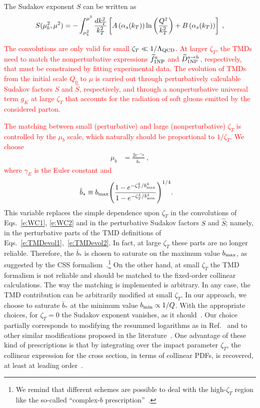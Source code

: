 \documentclass[aps,preprintnumbers,showpacs,nofootinbib,superscriptaddress,floatfix]{revtex4}
\newcommand{\bT}{\zeta_T}
\begin{document}
The Sudakov exponent $S$ can be written as
\begin{equation} 
S(\mu_b^2,\mu^2)=-\int_{\mu_b^2}^{\mu^2}{dk_T^2\over k_T^2}
\left[A\left(\alpha_s(k_T)\right)\ln\left({Q^2\over k_T^2}\right) 
+ B\left(\alpha_s(k_T)\right) \right] \; ,
\label{e:Sudakov} 
\end{equation} 

\textcolor{red}{The convolutions are only valid for small $\bT \ll
  1/\Lambda_{\rm QCD}$. At larger $\bT$, the TMDs need to match the
  nonperturbative expressions $\widetilde{f}_{1 \rm NP}^a$ and
  $\widetilde{D}_{1 {\rm NP}}^{a\to h}$, respectively, that must be
  constrained by fitting experimental data. The evolution of TMDs from the
  initial scale $Q_0$ to $\mu$ is carried out through perturbatively
  calculable Sudakov factors $S$ and $\hat{S}$, respectively, and through a
  nonperturbative universal term $g_K$ at large $\bT$ that accounts for the
  radiation of soft gluons emitted by the considered parton. } 

\textcolor{red}{The matching between small (perturbative) and large (nonperturbative) $\bT$ is controlled by the $\mu_b$ scale, which naturally should be proportional to $1/\bT$. We choose }
\begin{align} 
\mu_b &= \frac{2 e^{-\gamma_E}}{\bar{b}_{\ast}} \  ,
\label{e:mub}
\end{align}  
\textcolor{red}{where $\gamma_E$ is the Euler constant and }
\begin{align} 
\bar{b}_{\ast} &\equiv b_{\rm max} \Bigg(\frac{1-e^{- \bT^4 / b_{\rm max}^4} }{1-e^{- \bT^4 / b_{\rm min}^4}} \Bigg)^{1/4} .
\label{e:b*}
\end{align}  
This variable replaces the simple dependence upon $\bT$ in the
  convolutions of Eqs.~\eqref{e:WC1}, \eqref{e:WC2} and in the perturbative
  Sudakov factors $S$ and $\hat{S}$; namely, in the perturbative parts of the
  TMD definitions of Eqs.~\eqref{e:TMDevol1},~\eqref{e:TMDevol2}. In fact, at
  large $\bT$ these parts are no longer reliable. Therefore, the
  $\bar{b}_{\ast}$ is chosen to saturate on the maximum value $b_{\rm max}$,
  as suggested by the CSS 
  formalism~\cite{Collins:2011zzd,Aybat:2011zv}.\footnote{We remind that
  different schemes are possible to deal with 
the high-$\bT$ region like the so-called ``complex-$b$
prescription''~\cite{Laenen:2000de}.}
On the other hand, at
small $\bT$ the TMD formalism is not reliable and should be 
matched to the fixed-order collinear
calculations. The way
the matching is implemented is arbitrary.  In any case, the TMD contribution
can be arbitrarily modified at small $\bT$. In our approach, we choose to
saturate 
$\bar{b}_{\ast}$  at
the minimum value $b_{\rm min}\propto 1/Q$. With the appropriate choices, 
for $\bT=0$ the Sudakov exponent vanishes, as it
should~\cite{Parisi:1979se,Altarelli:1984pt}. 
Our choice partially corresponds to modifying the resummed logarithms as in
Ref.~\cite{Bozzi:2010xn} and to other similar modifications proposed in the
literature~\cite{Boer:2014tka,Collins:2016hqq}. One advantage of these kind of
prescriptions is that by integrating over the impact parameter $\bT$, the
collinear expression for the cross section, in terms of collinear PDFs, is
recovered, at least at leading order~\cite{Collins:2016hqq}.
\end{document}
